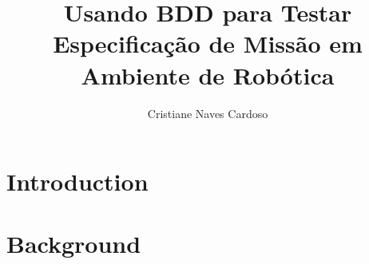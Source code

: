 \documentclass[bacharelado]{packages/unb-cic}%
\author{Cristiane Naves Cardoso}
\title{Usando BDD para Testar Especificação de Missão em Ambiente de Robótica}
\begin{document}
\capa
\doublespacing%
\newpage



%
%
%  
%
%
%
%
%
%

\section{Introduction}
\label{chap:introduction}


\pagebreak
\section{Background}
\label{chap:background}


\pagebreak


\pagebreak
\pagebreak

%



\end{document}
